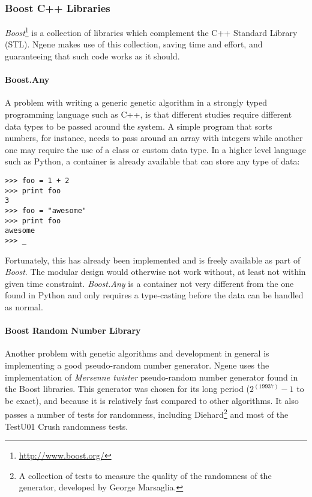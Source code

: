\subsubsection{Boost C++ Libraries}
\emph{Boost}\footnote{\url{http://www.boost.org/}} is a collection of libraries which complement the C++ Standard Library (STL). Ngene makes use of this collection, saving time and effort, and guaranteeing that such code works as it should.

\paragraph{\textbf{Boost.Any}}\cite{henney2001}
A problem with writing a generic genetic algorithm in a strongly typed programming language such as C++, is that different studies require different data types to be passed around the system. A simple program that sorts numbers, for instance, needs to pass around an array with integers while another one may require the use of a class or custom data type. In a higher level language such as Python, a container is already available that can store any type of data:

\begin{verbatim}
>>> foo = 1 + 2
>>> print foo
3
>>> foo = "awesome"
>>> print foo
awesome
>>> _
\end{verbatim}

Fortunately, this has already been implemented and is freely available as part of \emph{Boost}. The modular design would otherwise not work without, at least not within given time constraint. \emph{Boost.Any} is a container not very different from the one found in Python and only requires a type-casting before the data can be handled as normal.

\paragraph{\textbf{Boost Random Number Library}}\cite{maurer2000}
Another problem with genetic algorithms and development in general is implementing a good pseudo-random number generator. Ngene uses the implementation of \emph{Mersenne twister} pseudo-random number generator found in the Boost libraries. This generator was chosen for its long period ($2^(19937) - 1$ to be exact), and because it is relatively fast compared to other algorithms. It also passes a number of tests for randomness, including Diehard\footnote{A collection of tests to measure the quality of the randomness of the generator, developed by George Marsaglia.} and most of the TestU01 Crush randomness tests.

